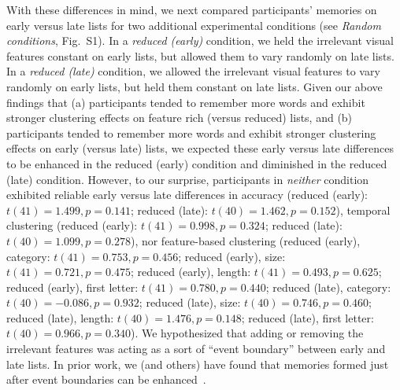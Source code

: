 \documentclass[11pt]{article}
\newcommand{\dynamicsRandom}{S1}
\begin{document}
With these differences in mind, we next compared participants' memories on
early versus late lists for two additional experimental conditions (see
\textit{Random conditions}, Fig.~\dynamicsRandom). In a \textit{reduced
(early)} condition, we held the irrelevant visual features constant on early
lists, but allowed them to vary randomly on late lists. In a \textit{reduced
(late)} condition, we allowed the irrelevant visual features to vary randomly
on early lists, but held them constant on late lists. Given our above findings
that (a) participants tended to remember more words and exhibit stronger
clustering effects on feature rich (versus reduced) lists, and (b) participants
tended to remember more words and exhibit stronger clustering effects on early
(versus late) lists, we expected these early versus late differences to be
enhanced in the reduced (early) condition and diminished in the reduced (late)
condition. However, to our surprise, participants in \textit{neither} condition
exhibited reliable early versus late differences in accuracy (reduced (early):
$t(41) = 1.499, p = 0.141$; reduced (late): $t(40) = 1.462, p = 0.152$),
temporal clustering (reduced (early): $t(41) = 0.998, p = 0.324$; reduced
(late): $t(40) = 1.099, p = 0.278$), nor feature-based clustering (reduced
(early), category: $t(41) = 0.753, p = 0.456$; reduced (early), size: $t(41) =
0.721, p = 0.475$; reduced (early), length: $t(41) = 0.493, p = 0.625$; reduced
(early), first letter: $t(41) = 0.780, p = 0.440$; reduced (late), category:
$t(40) = -0.086, p = 0.932$; reduced (late), size: $t(40) = 0.746, p = 0.460$;
reduced (late), length: $t(40) = 1.476, p = 0.148$; reduced (late), first
letter: $t(40) = 0.966, p = 0.340$). We hypothesized that adding or removing
the irrelevant features was acting as a sort of ``event boundary'' between
early and late lists. In prior work, we (and others) have found that memories
formed just after event boundaries can be enhanced~\citep[e.g., due to less
contextual interference between pre- and post-boundary items;][]{MannEtal16,
PettEtal16, GoldEtal17, FlorEtal17}.
\end{document}
